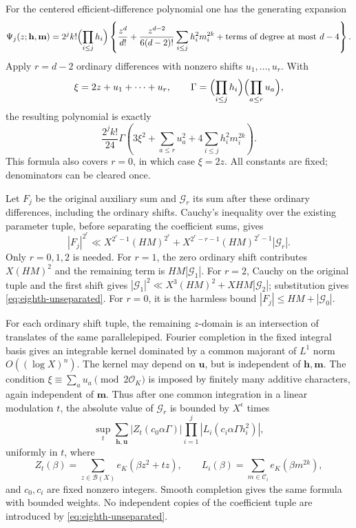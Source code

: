 \documentclass[11pt,reqno]{amsart}
\numberwithin{equation}{section}
\theoremstyle{definition}
\begin{document}
For the centered efficient-difference polynomial one has the generating
expansion
\[
 \Psi_j(z;\mathbf h,\mathbf m)
 =2^jk!\Bigl(\prod_{i\le j}h_i\Bigr)
 \left\{\frac{z^d}{d!}
   +\frac{z^{d-2}}{6(d-2)!}\sum_{i\le j}h_i^2m_i^{2k}
   +\text{terms of degree at most }d-4\right\}.
\]
Apply $r=d-2$ ordinary differences with nonzero shifts $u_1,\ldots,u_r$.
With
\[
 \xi=2z+u_1+\cdots+u_r,\qquad
 \Gamma=\Bigl(\prod_{i\le j}h_i\Bigr)\Bigl(\prod_{a\le r}u_a\Bigr),
\]
the resulting polynomial is exactly
\begin{equation}\label{eq:eighth-exact-quadratic}
 \frac{2^jk!}{24}\Gamma
 \left(3\xi^2+\sum_{a\le r}u_a^2
                         +4\sum_{i\le j}h_i^2m_i^{2k}\right).
\end{equation}
This formula also covers $r=0$, in which case $\xi=2z$.
All constants are fixed; denominators can be cleared once.

Let $F_j$ be the original auxiliary sum and $\mathcal G_r$ its sum after
these ordinary differences, including the ordinary shifts. Cauchy's
inequality over the existing parameter tuple, before separating the
coefficient sums, gives
\begin{equation}\label{eq:eighth-unseparated}
 |F_j|^{2^r}\ll
       X^{2^r-1}(HM)^{2^r}
       +X^{2^r-r-1}(HM)^{2^r-1}|\mathcal G_r|.
\end{equation}
Only $r=0,1,2$ is needed. For $r=1$, the zero ordinary shift contributes
$X(HM)^2$ and the remaining term is $HM|\mathcal G_1|$.
For $r=2$, Cauchy on the original tuple and the first shift gives
$|\mathcal G_1|^2\ll X^3(HM)^2+XHM|\mathcal G_2|$; substitution gives
\eqref{eq:eighth-unseparated}. For $r=0$, it is the harmless bound
$|F_j|\le HM+|\mathcal G_0|$.

For each ordinary shift tuple, the remaining $z$-domain is an intersection
of translates of the same parallelepiped. Fourier completion in the fixed
integral basis gives an integrable kernel dominated by a common majorant
of $L^1$ norm $O((\log X)^n)$. The kernel may depend on $\mathbf u$, but
is independent of $\mathbf h,\mathbf m$. The condition
$\xi\equiv\sum_a u_a\pmod{2\mathcal O_K}$ is imposed by finitely many
additive characters, again independent of $\mathbf m$. Thus after one
common integration in a linear modulation $t$, the absolute value of
$\mathcal G_r$ is bounded by $X^\epsilon$ times
\begin{equation}\label{eq:eighth-separated-product}
 \sup_t\sum_{\mathbf h,\mathbf u}
       |Z_t(c_0\alpha\Gamma)|
       \prod_{i=1}^j|L_i(c_i\alpha\Gamma h_i^2)|,
\end{equation}
uniformly in $t$, where
\[
 Z_t(\beta)=\sum_{z\in\mathcal B(X)}e_K(\beta z^2+tz),\qquad
 L_i(\beta)=\sum_{m\in\mathcal C_i}e_K(\beta m^{2k}),
\]
and $c_0,c_i$ are fixed nonzero integers. Smooth completion gives the same
formula with bounded weights. No independent copies of the coefficient
tuple are introduced by \eqref{eq:eighth-unseparated}.
\end{document}
